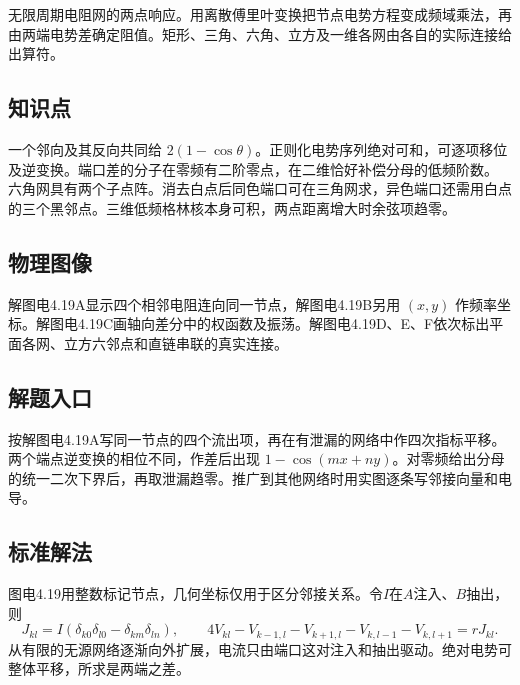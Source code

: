 \documentclass[UTF8,fontset=fandol,a4paper,11pt]{ctexart}
\begin{document}
无限周期电阻网的两点响应。用离散傅里叶变换把节点电势方程变成频域乘法，再由两端电势差确定阻值。矩形、三角、六角、立方及一维各网由各自的实际连接给出算符。



\subsection*{知识点}

一个邻向及其反向共同给 $2(1-\cos\theta)$。正则化电势序列绝对可和，可逐项移位及逆变换。端口差的分子在零频有二阶零点，在二维恰好补偿分母的低频阶数。
六角网具有两个子点阵。消去白点后同色端口可在三角网求，异色端口还需用白点的三个黑邻点。三维低频格林核本身可积，两点距离增大时余弦项趋零。



\subsection*{物理图像}

解图电4.19A显示四个相邻电阻连向同一节点，解图电4.19B另用 $(x,y)$ 作频率坐标。解图电4.19C画轴向差分中的权函数及振荡。解图电4.19D、E、F依次标出平面各网、立方六邻点和直链串联的真实连接。



\subsection*{解题入口}

按解图电4.19A写同一节点的四个流出项，再在有泄漏的网络中作四次指标平移。两个端点逆变换的相位不同，作差后出现 $1-\cos(mx+ny)$。对零频给出分母的统一二次下界后，再取泄漏趋零。推广到其他网络时用实图逐条写邻接向量和电导。


\subsection*{标准解法}

图电4.19用整数标记节点，几何坐标仅用于区分邻接关系。令$I$在$A$注入、$B$抽出，则
\[
J_{kl}=I(\delta_{k0}\delta_{l0}-\delta_{km}\delta_{ln}),\qquad
4V_{kl}-V_{k-1,l}-V_{k+1,l}-V_{k,l-1}-V_{k,l+1}=rJ_{kl}.
\]
从有限的无源网络逐渐向外扩展，电流只由端口这对注入和抽出驱动。绝对电势可整体平移，所求是两端之差。
\end{document}
